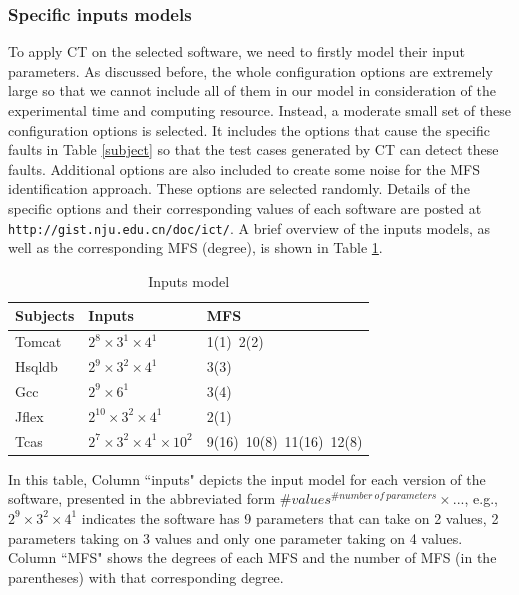 \documentclass[journal,12pt,onecolumn,draftclsnofoot,]{IEEEtran}
\begin{document}
\subsubsection{Specific inputs models}
To apply CT on the selected software, we need to firstly model their input parameters. As discussed before, the whole configuration options are extremely large so that we cannot include all of them in our model in consideration of the experimental time and computing resource. Instead, a moderate small set of these configuration options is selected.  It includes the options that cause the specific faults in Table \ref{subject} so that the test cases generated by CT can detect these faults. Additional options are also included to create some noise for the MFS identification approach. These options are selected randomly. Details of the specific options and their corresponding values of each software are posted at \texttt{http://gist.nju.edu.cn/doc/ict/}.  A brief overview of the inputs models, as well as the corresponding MFS (degree), is shown in Table \ref{inputs}.


\begin{table}[ht]
\caption{Inputs model }
\label{inputs}
\centering
\begin{tabular}{l|l|l}
\hline
Subjects & Inputs & MFS \\
\hline
Tomcat   &  $2^{8} \times 3^{1} \times 4^{1}$       & 1(1)\ 2(2)  \\
Hsqldb   &   $2^{9} \times 3^{2} \times 4^{1}$      &  3(3) \\
Gcc      &   $2^{9} \times 6^{1}$      &    3(4)  \\
Jflex    & $2^{10} \times 3^{2} \times 4^{1} $        &   2(1)   \\
Tcas     &  $2^{7} \times 3^{2} \times 4^{1} \times 10^{2} $ &9(16)\ 10(8)\ 11(16)\ 12(8) \\ \hline
\end{tabular}

\end{table}
In this table, Column ``inputs" depicts the input model for each version of the software, presented in the abbreviated form $\#values^{\#number\ of\ parameters} \times ...$, e.g., $2^{9} \times 3^{2} \times 4^{1}$ indicates the software has 9 parameters that can take on 2 values, 2 parameters taking on 3 values and only one parameter taking on 4 values. Column ``MFS" shows the degrees of each MFS and the number of MFS (in the parentheses) with that corresponding degree.
\end{document}
